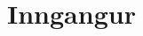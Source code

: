 \documentclass[12pt, draft, isbabel]{rureport}
\begin{document}
\maketitle

\tableofcontents

\listoffixmes

\clearpage

\section{Inngangur}




\printbibliography
\end{document}
